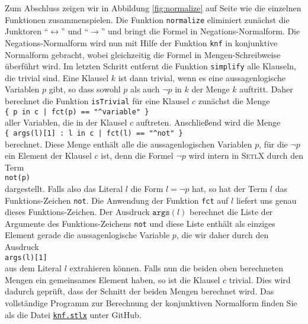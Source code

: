 Zum Abschluss zeigen wir in Abbildung \ref{fig:normalize} auf Seite \pageref{fig:normalize}
wie die einzelnen Funktionen zusammenspielen.  Die Funktion \texttt{normalize} eliminiert
zun\"{a}chst die Junktoren ``$\leftrightarrow$'' und ``$\rightarrow$'' und bringt die Formel
in Negations-Normalform.  Die Negations-Normalform wird nun mit Hilfe der Funktion
\texttt{knf} in konjunktive Normalform gebracht, wobei gleichzeitig die Formel in
Mengen-Schreibweise \"{u}berf\"{u}hrt wird.  Im letzten Schritt entfernt die Funktion
\texttt{simplify} alle Klauseln, die trivial sind.   Eine Klausel $k$ ist dann trivial,
wenn es eine aussagenlogische Variablen $p$ gibt, so dass sowohl $p$ als auch $\neg p$
in $k$ der Menge $k$ auftritt.  Daher berechnet die Funktion \texttt{isTrivial} f\"{u}r eine
Klausel $c$ zun\"{a}chst die Menge
\\[0.2cm]
\hspace*{1.3cm}
\verb'{ p in c | fct(p) == "^variable" }'
\\[0.2cm]
aller Variablen, die in der Klausel $c$ auftreten.  Anschlie\ss{}end wird die Menge
\\[0.2cm]
\hspace*{1.3cm}
\verb'{ args(l)[1] : l in c | fct(l) == "^not" }'
\\[0.2cm]
berechnet.  Diese Menge enth\"{a}lt alle die aussagenlogischen Variablen $p$, f\"{u}r die $\neg p$
ein Element der Klausel $c$ ist, denn die Formel $\neg p$ wird intern in \textsc{SetlX}
durch den Term
\\[0.2cm]
\hspace*{1.3cm}
\texttt{not(p)}
\\[0.2cm]
dargestellt.  Falls also das Literal $l$ die Form $l = \neg p$ hat, so hat der Term $l$
das Funktions-Zeichen \texttt{not}.  Die Anwendung der Funktion
\texttt{fct} auf $l$ liefert uns genau dieses Funktions-Zeichen.  Der Ausdruck
$\texttt{args}(l)$ berechnet die Liste der Argumente des Funktions-Zeichens 
\texttt{not} und diese Liste enth\"{a}lt als einziges Element gerade die
aussagenlogische Variable $p$, die wir daher durch den Ausdruck
\\[0.2cm]
\hspace*{1.3cm}
\texttt{args(l)[1]}
\\[0.2cm]
aus dem Literal $l$ extrahieren k\"{o}nnen.  Falls nun die beiden oben berechneten Mengen ein
gemeinsames Element haben, so ist die Klausel $c$ trivial.  Dies wird dadurch gepr\"{u}ft,
dass der Schnitt der beiden Mengen berechnet wird.
Das vollst\"{a}ndige Programm zur Berechnung der konjunktiven Normalform finden Sie als die Datei
\href{https://github.com/karlstroetmann/Logik/blob/master/SetlX/knf.stlx}{\texttt{knf.stlx}}
unter GitHub.

